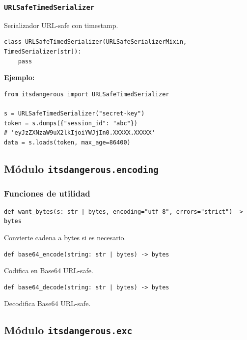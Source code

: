 \documentclass[11pt,a4paper]{article}
\begin{document}
\subsubsection*{\texttt{URLSafeTimedSerializer}}


Serializador URL-safe con timestamp.


\begin{lstlisting}
class URLSafeTimedSerializer(URLSafeSerializerMixin, TimedSerializer[str]):
    pass
\end{lstlisting}


\textbf{Ejemplo:}


\begin{lstlisting}
from itsdangerous import URLSafeTimedSerializer

s = URLSafeTimedSerializer("secret-key")
token = s.dumps({"session_id": "abc"})
# 'eyJzZXNzaW9uX2lkIjoiYWJjIn0.XXXXX.XXXXX'
data = s.loads(token, max_age=86400)
\end{lstlisting}


\subsection*{Módulo \texttt{itsdangerous.encoding}}


\subsubsection*{Funciones de utilidad}


\begin{lstlisting}
def want_bytes(s: str | bytes, encoding="utf-8", errors="strict") -> bytes
\end{lstlisting}


Convierte cadena a bytes si es necesario.


\begin{lstlisting}
def base64_encode(string: str | bytes) -> bytes
\end{lstlisting}


Codifica en Base64 URL-safe.


\begin{lstlisting}
def base64_decode(string: str | bytes) -> bytes
\end{lstlisting}


Decodifica Base64 URL-safe.


\subsection*{Módulo \texttt{itsdangerous.exc}}
\end{document}
